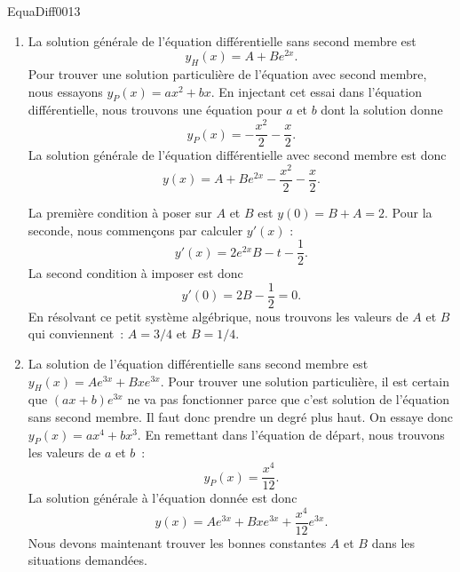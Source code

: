 \begin{corrige}{EquaDiff0013}

	\begin{enumerate}

		\item
			La solution générale de l'équation différentielle sans second membre est
			\begin{equation}
				y_H(x)=A+B e^{2x}.
			\end{equation}
			Pour trouver une solution particulière de l'équation avec second membre, nous essayons $y_P(x)=ax^2+bx$. En injectant cet essai dans l'équation différentielle, nous trouvons une équation pour $a$ et $b$ dont la solution donne
			\begin{equation}
				y_P(x)=-\frac{ x^2 }{2}-\frac{ x }{2}.
			\end{equation}
			La solution générale de l'équation différentielle avec second membre est donc
			\begin{equation}
				y(x)=A+B e^{2x}-\frac{ x^2 }{ 2 }-\frac{ x }{2}.
			\end{equation}
			
			La première condition à poser sur $A$ et $B$ est $y(0)=B+A=2$. Pour la seconde, nous commençons par calculer $y'(x)$ :
			\begin{equation}
				y'(x)=2 e^{2x}B-t-\frac{ 1 }{2}.
			\end{equation}
			La second condition à imposer est donc
			\begin{equation}
				y'(0)=2B-\frac{1}{ 2 }=0.
			\end{equation}
			En résolvant ce petit système algébrique, nous trouvons les valeurs de $A$ et $B$ qui conviennent~: $A=3/4$ et $B=1/4$.

		\item
			La solution de l'équation différentielle sans second membre est $y_H(x)=A e^{3x}+Bx e^{3x}$. Pour trouver une solution particulière, il est certain que $(ax+b) e^{3x}$ ne va pas fonctionner parce que c'est solution de l'équation sans second membre. Il faut donc prendre un degré plus haut. On essaye donc $y_P(x)=ax^4+bx^3$. En remettant dans l'équation de départ, nous trouvons les valeurs de $a$ et $b$~:
			\begin{equation}
				y_P(x)=\frac{ x^4 }{ 12 }.
			\end{equation}
			La solution générale à l'équation donnée est donc
			\begin{equation}
				y(x)=A e^{3x}+Bx e^{3x}+\frac{ x^4 }{ 12 } e^{3x}.
			\end{equation}
			Nous devons maintenant trouver les bonnes constantes $A$ et $B$ dans les situations demandées.
			\begin{enumerate}


\end{enumerate}
\end{enumerate}
\end{corrige}
